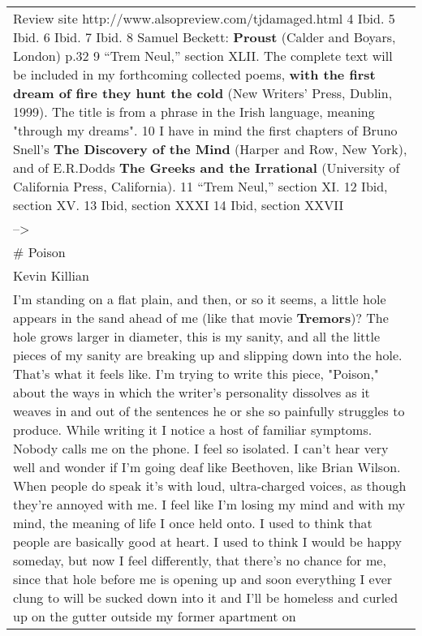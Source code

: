 \begin{longtable}[]{@{}l@{}}
\begin{minipage}[t]{0.97\columnwidth}
Review site http://www.alsopreview.com/tjdamaged.html 4 Ibid. 5 Ibid. 6
Ibid. 7 Ibid. 8 Samuel Beckett: \textbf{Proust} (Calder and Boyars,
London) p.32 9 ``Trem Neul,'' section XLII. The complete text will be
included in my forthcoming collected poems, \textbf{with the first dream
of fire they hunt the cold} (New Writers' Press, Dublin, 1999). The
title is from a phrase in the Irish language, meaning "through my
dreams". 10 I have in mind the first chapters of Bruno Snell's
\textbf{The Discovery of the Mind} (Harper and Row, New York), and of
E.R.Dodds \textbf{The Greeks and the Irrational} (University of
California Press, California). 11 ``Trem Neul,'' section XI. 12 Ibid,
section XV. 13 Ibid, section XXXI 14 Ibid, section XXVII\strut
\end{minipage}\tabularnewline
\begin{minipage}[t]{0.97\columnwidth}\raggedright
--\textgreater{}\strut
\end{minipage}\tabularnewline
\begin{minipage}[t]{0.97\columnwidth}\raggedright
\# Poison\strut
\end{minipage}\tabularnewline
\begin{minipage}[t]{0.97\columnwidth}\raggedright
Kevin Killian\strut
\end{minipage}\tabularnewline
\begin{minipage}[t]{0.97\columnwidth}\raggedright
I'm standing on a flat plain, and then, or so it seems, a little hole
appears in the sand ahead of me (like that movie \textbf{Tremors})? The
hole grows larger in diameter, this is my sanity, and all the little
pieces of my sanity are breaking up and slipping down into the hole.
That's what it feels like. I'm trying to write this piece, "Poison,"
about the ways in which the writer's personality dissolves as it weaves
in and out of the sentences he or she so painfully struggles to produce.
While writing it I notice a host of familiar symptoms. Nobody calls me
on the phone. I feel so isolated. I can't hear very well and wonder if
I'm going deaf like Beethoven, like Brian Wilson. When people do speak
it's with loud, ultra-charged voices, as though they're annoyed with me.
I feel like I'm losing my mind and with my mind, the meaning of life I
once held onto. I used to think that people are basically good at heart.
I used to think I would be happy someday, but now I feel differently,
that there's no chance for me, since that hole before me is opening up
and soon everything I ever clung to will be sucked down into it and I'll
be homeless and curled up on the gutter outside my former apartment on

\end{minipage}
\end{longtable}
